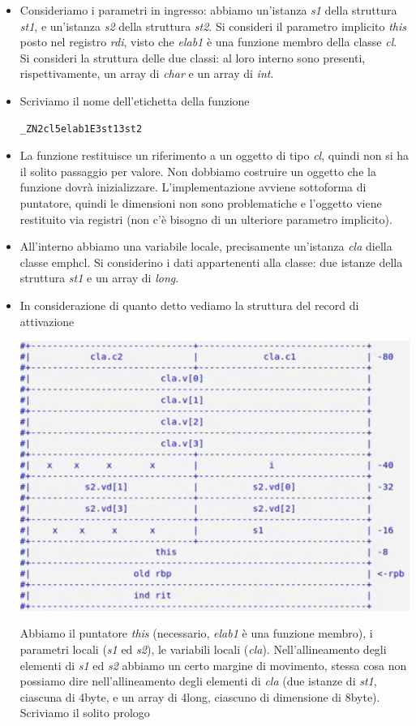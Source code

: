 \documentclass[11pt]{report}
\theoremstyle{definition}
\begin{document}
\begin{itemize}
\item Consideriamo i parametri in ingresso: abbiamo un'istanza \emph{s1} della struttura \emph{st1}, e un'istanza \emph{s2} della struttura \emph{st2}. Si consideri il parametro implicito \emph{this} posto nel registro \emph{rdi}, visto che \emph{elab1} è una funzione membro della classe \emph{cl}. Si consideri la struttura delle due classi: al loro interno sono presenti, rispettivamente, un array di \emph{char} e un array di \emph{int}.
\item Scriviamo il nome dell'etichetta della funzione
\begin{verbatim}
_ZN2cl5elab1E3st13st2
\end{verbatim}
\item La funzione restituisce un riferimento a un oggetto di tipo \emph{cl}, quindi non si ha il solito passaggio per valore. Non dobbiamo costruire un oggetto che la funzione dovrà inizializzare. L'implementazione avviene sottoforma di puntatore, quindi le dimensioni non sono problematiche e l'oggetto viene restituito via registri (non c'è bisogno di un ulteriore parametro implicito).
\item All'interno abbiamo una variabile locale, precisamente un'istanza \emph{cla} diella classe emph{cl}. Si considerino i dati appartenenti alla classe: due istanze della struttura \emph{st1} e un array di \emph{long}.
\item In considerazione di quanto detto vediamo la struttura del record di attivazione
\begin{center}
\includegraphics{img/49.PNG}
\end{center}  
Abbiamo il puntatore \emph{this} (necessario, \emph{elab1} è una funzione membro), i parametri locali (\emph{s1} ed \emph{s2}), le variabili locali (\emph{cla}). Nell'allineamento degli elementi di \emph{s1} ed \emph{s2} abbiamo un certo margine di movimento, stessa cosa non possiamo dire nell'allineamento degli elementi di \emph{cla} (due istanze di \emph{st1}, ciascuna di 4byte, e un array di 4long, ciascuno di dimensione di 8byte). Scriviamo il solito prologo

\end{itemize}
\end{document}
